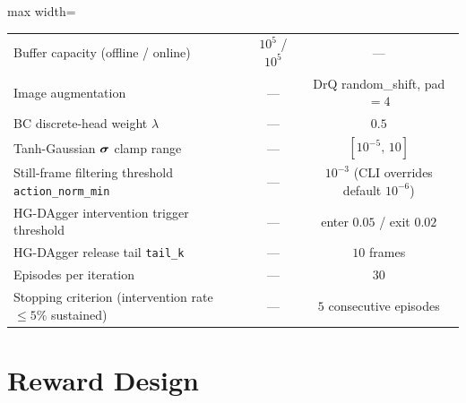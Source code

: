 \begin{table}[htbp]
\begin{adjustbox}{max width=\textwidth}
\begin{tabular}{@{}lcc@{}}
    Buffer capacity (offline / online) & $10^5$ / $10^5$ & --- \\
    Image augmentation & --- & DrQ random\_shift, pad $= 4$ \\
    \midrule
    BC discrete-head weight $\lambda$ & --- & $0.5$ \\
    Tanh-Gaussian $\bm{\sigma}$ clamp range & --- & $[10^{-5},\, 10]$ \\
    Still-frame filtering threshold \texttt{action\_norm\_min} & --- & $10^{-3}$ (CLI overrides default $10^{-6}$) \\
    \midrule
    HG-DAgger intervention trigger threshold & --- & enter $0.05$ / exit $0.02$ \\
    HG-DAgger release tail \texttt{tail\_k} & --- & $10$ frames \\
    Episodes per iteration & --- & $30$ \\
    Stopping criterion (intervention rate $\leq 5\%$ sustained) & --- & $5$ consecutive episodes \\
    \bottomrule
  \end{tabular}
  \end{adjustbox}
\end{table}

\section{Reward Design}\label{sec:task_reward}

